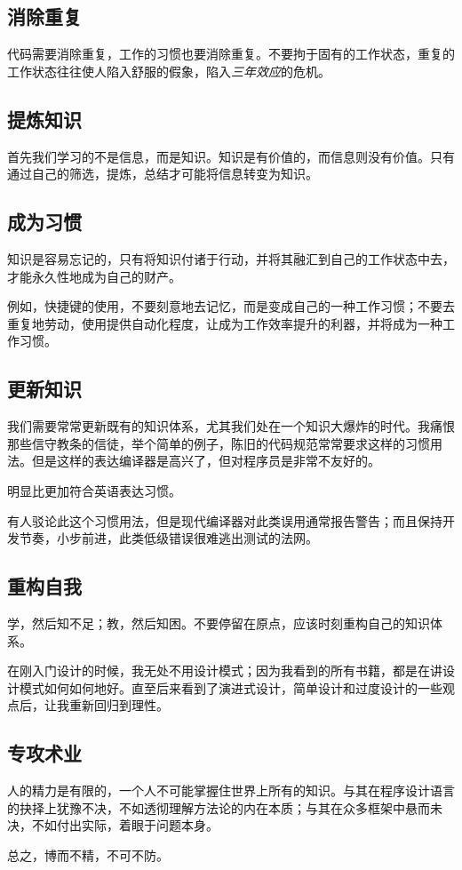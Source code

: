 \begin{content}

\subsection{消除重复}

代码需要消除重复，工作的习惯也要消除重复。不要拘于固有的工作状态，重复的工作状态往往使人陷入舒服的假象，陷入\emph{三年效应}的危机。

\subsection{提炼知识}

首先我们学习的不是信息，而是知识。知识是有价值的，而信息则没有价值。只有通过自己的筛选，提炼，总结才可能将信息转变为知识。

\subsection{成为习惯}

知识是容易忘记的，只有将知识付诸于行动，并将其融汇到自己的工作状态中去，才能永久性地成为自己的财产。

例如，快捷键的使用，不要刻意地去记忆，而是变成自己的一种工作习惯；不要去重复地劳动，使用提供自动化程度，让成为工作效率提升的利器，并将成为一种工作习惯。

\subsection{更新知识}

我们需要常常更新既有的知识体系，尤其我们处在一个知识大爆炸的时代。我痛恨那些信守教条的信徒，举个简单的例子，陈旧的代码规范常常要求这样的习惯用法。但是这样的表达编译器是高兴了，但对程序员是非常不友好的。

明显比更加符合英语表达习惯。

有人驳论此这个习惯用法，但是现代编译器对此类误用通常报告警告；而且保持开发节奏，小步前进，此类低级错误很难逃出测试的法网。

\subsection{重构自我}

学，然后知不足；教，然后知困。不要停留在原点，应该时刻重构自己的知识体系。

在刚入门设计的时候，我无处不用设计模式；因为我看到的所有书籍，都是在讲设计模式如何如何地好。直至后来看到了演进式设计，简单设计和过度设计的一些观点后，让我重新回归到理性。

\subsection{专攻术业}

人的精力是有限的，一个人不可能掌握住世界上所有的知识。与其在程序设计语言的抉择上犹豫不决，不如透彻理解方法论的内在本质；与其在众多框架中悬而未决，不如付出实际，着眼于问题本身。

总之，博而不精，不可不防。

\end{content}